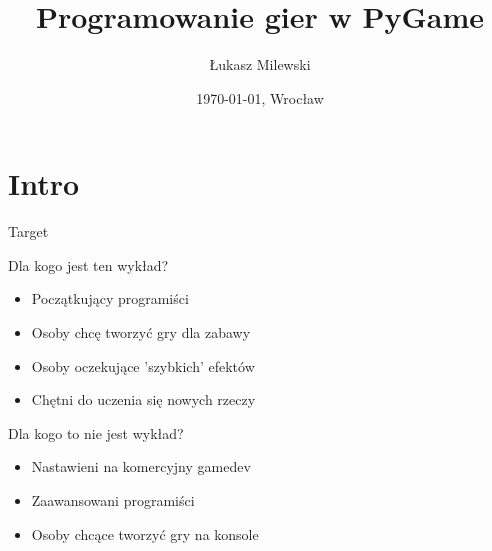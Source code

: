 \documentclass{beamer}
\title{Programowanie gier w PyGame}
\author{Łukasz Milewski}
\institute{Uniwersytet Wrocławski}
\date{\today, Wrocław}
\begin{document}
\begin{frame}
  \titlepage
\end{frame}

\section{Intro}

\begin{frame}{Target}

  \begin{block}{Dla kogo jest ten wykład?}
    \begin{itemize}
    \item Początkujący programiści
    \item Osoby chcę tworzyć gry dla zabawy
    \item Osoby oczekujące 'szybkich' efektów
    \item Chętni do uczenia się nowych rzeczy
    \end{itemize}
  \end{block}

  \begin{alertblock}{Dla kogo to nie jest wykład?}
    \begin{itemize}
    \item Nastawieni na komercyjny gamedev
    \item Zaawansowani programiści
    \item Osoby chcące tworzyć gry na konsole
    \end{itemize}
  \end{alertblock}

\end{frame}
\end{document}
